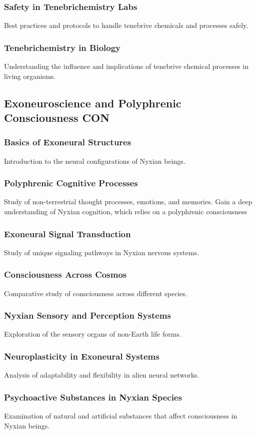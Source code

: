 \subsubsection{Safety in Tenebrichemistry Labs}
Best practices and protocols to handle tenebrive chemicals and processes safely.
\subsubsection{Tenebrichemistry in Biology}
Understanding the influence and implications of tenebrive chemical processes in living organisms.


\subsection{Exoneuroscience and Polyphrenic Consciousness \hfill CON}
\subsubsection{Basics of Exoneural Structures}
Introduction to the neural configurations of Nyxian beings.
\subsubsection{Polyphrenic Cognitive Processes}
Study of non-terrestrial thought processes, emotions, and memories. Gain a deep understanding of Nyxian cognition, which relies on a polyphrenic consciousness
\subsubsection{Exoneural Signal Transduction}
Study of unique signaling pathways in Nyxian nervous systems.
\subsubsection{Consciousness Across Cosmos}
Comparative study of consciousness across different species.
\subsubsection{Nyxian Sensory and Perception Systems}
Exploration of the sensory organs of non-Earth life forms.
\subsubsection{Neuroplasticity in Exoneural Systems}
Analysis of adaptability and flexibility in alien neural networks.
\subsubsection{Psychoactive Substances in Nyxian Species}
Examination of natural and artificial substances that affect consciousness in Nyxian beings.

